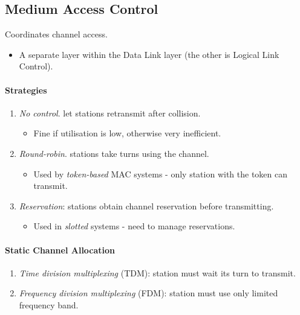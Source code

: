 \documentclass[twocolumn,english]{article}
\begin{document}
\subsection{Medium Access Control}

Coordinates channel access.
\begin{itemize}
\item A separate layer within the Data Link layer (the other is Logical
Link Control). 
\end{itemize}

\paragraph{Strategies}
\begin{enumerate}
\item \emph{No control}. let stations retransmit after collision.
\begin{itemize}
\item Fine if utilisation is low, otherwise very inefficient.
\end{itemize}
\item \emph{Round-robin}. stations take turns using the channel.
\begin{itemize}
\item Used by \emph{token-based} MAC systems - only station with the token
can transmit.
\end{itemize}
\item \emph{Reservation}: stations obtain channel reservation before transmitting.
\begin{itemize}
\item Used in \emph{slotted} systems - need to manage reservations.
\end{itemize}
\end{enumerate}

\paragraph{Static Channel Allocation}
\begin{enumerate}
\item \emph{Time division multiplexing} (TDM): station must wait its turn
to transmit.
\item \emph{Frequency division multiplexing} (FDM): station must use only
limited frequency band.
\end{enumerate}
\end{document}
